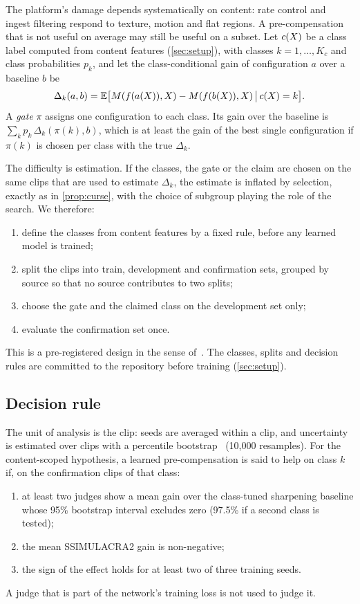 The platform's damage depends systematically on content: rate control and ingest filtering respond
to texture, motion and flat regions. A pre-compensation that is not useful on average may still be
useful on a subset. Let $c(X)$ be a class label computed from content features (\cref{sec:setup}),
with classes $k=1,\dots,K_c$ and class probabilities $p_k$, and let the class-conditional gain of
configuration $a$ over a baseline $b$ be
\begin{equation}
  \Delta_k(a,b)=\mathbb{E}\big[M(f(a(X)),X)-M(f(b(X)),X)\,\big|\,c(X)=k\big].
\end{equation}
A \emph{gate} $\pi$ assigns one configuration to each class. Its gain over the baseline is
$\sum_k p_k\,\Delta_k(\pi(k),b)$, which is at least the gain of the best single configuration if
$\pi(k)$ is chosen per class with the true $\Delta_k$.

The difficulty is estimation. If the classes, the gate or the claim are chosen on the same clips
that are used to estimate $\Delta_k$, the estimate is inflated by selection, exactly as in
\cref{prop:curse}, with the choice of subgroup playing the role of the search. We therefore:
\begin{enumerate}
  \item define the classes from content features by a fixed rule, before any learned model is
        trained;
  \item split the clips into train, development and confirmation sets, grouped by source so that
        no source contributes to two splits;
  \item choose the gate and the claimed class on the development set only;
  \item evaluate the confirmation set once.
\end{enumerate}
This is a pre-registered design in the sense of~\cite{nosek2018preregistration}. The classes,
splits and decision rules are committed to the repository before training (\cref{sec:setup}).

\subsection{Decision rule}
\label{sec:decision}

The unit of analysis is the clip: seeds are averaged within a clip, and uncertainty is estimated
over clips with a percentile bootstrap~\cite{efron1993introduction} (10{,}000 resamples). For the
content-scoped hypothesis, a learned pre-compensation is said to help on class $k$ if, on the
confirmation clips of that class:
\begin{enumerate}
  \item at least two judges show a mean gain over the class-tuned sharpening baseline whose 95\%
        bootstrap interval excludes zero (97.5\% if a second class is tested);
  \item the mean SSIMULACRA2 gain is non-negative;
  \item the sign of the effect holds for at least two of three training seeds.
\end{enumerate}
A judge that is part of the network's training loss is not used to judge it.
